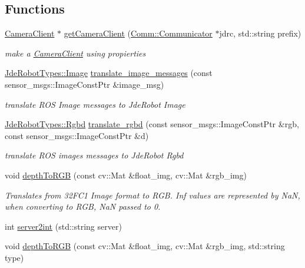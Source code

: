 \subsection*{Functions}
\begin{DoxyCompactItemize}
\item 
\hyperlink{class_comm_1_1_camera_client}{Camera\+Client} $\ast$ \hyperlink{namespace_comm_a488b3721b4d9a501e8cd38388ab30437}{get\+Camera\+Client} (\hyperlink{class_comm_1_1_communicator}{Comm\+::\+Communicator} $\ast$jdrc, std\+::string prefix)
\begin{DoxyCompactList}\small\item\em make a \hyperlink{class_comm_1_1_camera_client}{Camera\+Client} using propierties \end{DoxyCompactList}\item 
\hyperlink{class_jde_robot_types_1_1_image}{Jde\+Robot\+Types\+::\+Image} \hyperlink{namespace_comm_ad9eade500ada9cd99a62086a53986e36}{translate\+\_\+image\+\_\+messages} (const sensor\+\_\+msgs\+::\+Image\+Const\+Ptr \&image\+\_\+msg)
\begin{DoxyCompactList}\small\item\em translate R\+OS Image messages to Jde\+Robot Image \end{DoxyCompactList}\item 
\hyperlink{class_jde_robot_types_1_1_rgbd}{Jde\+Robot\+Types\+::\+Rgbd} \hyperlink{namespace_comm_a7e4e8f50789805802aea4d68670a495c}{translate\+\_\+rgbd} (const sensor\+\_\+msgs\+::\+Image\+Const\+Ptr \&rgb, const sensor\+\_\+msgs\+::\+Image\+Const\+Ptr \&d)
\begin{DoxyCompactList}\small\item\em translate R\+OS images messages to Jde\+Robot Rgbd \end{DoxyCompactList}\item 
void \hyperlink{namespace_comm_afe46bbd9c6bec183b93879e39e21fcbc}{depth\+To\+R\+GB} (const cv\+::\+Mat \&float\+\_\+img, cv\+::\+Mat \&rgb\+\_\+img)
\begin{DoxyCompactList}\small\item\em Translates from 32\+F\+C1 Image format to R\+GB. Inf values are represented by NaN, when converting to R\+GB, NaN passed to 0. \end{DoxyCompactList}\item 
int \hyperlink{namespace_comm_ab6b021c81a3c5ebabd75caaffa9f16da}{server2int} (std\+::string server)
\item 
void \hyperlink{namespace_comm_ad99fee34a48e5331dfa18b2b766e7df2}{depth\+To\+R\+GB} (const cv\+::\+Mat \&float\+\_\+img, cv\+::\+Mat \&rgb\+\_\+img, std\+::string type)
\end{DoxyCompactItemize}
